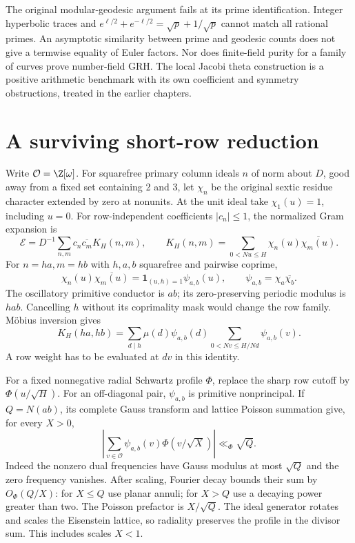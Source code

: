 \documentclass[11pt,oneside,openany]{book}
\theoremstyle{definition}\newtheorem{definition}[theorem]{Definition}
\theoremstyle{remark}\newtheorem{remark}[theorem]{Remark}
\begin{document}
The original modular-geodesic argument fails at its prime identification. Integer hyperbolic traces and $e^{\ell/2}+e^{-\ell/2}=\sqrt p+1/\sqrt p$ cannot match all rational primes. An asymptotic similarity between prime and geodesic counts does not give a termwise equality of Euler factors. Nor does finite-field purity for a family of curves prove number-field GRH. The local Jacobi theta construction is a positive arithmetic benchmark with its own coefficient and symmetry obstructions, treated in the earlier chapters.

\section{A surviving short-row reduction}
Write $\mathcal O=\Z[\omega]$. For squarefree primary column ideals $n$ of norm about $D$, good away from a fixed set containing 2 and 3, let $\chi_n$ be the original sextic residue character extended by zero at nonunits. At the unit ideal take $\chi_1(u)=1$, including $u=0$. For row-independent coefficients $|c_n|\le1$, the normalized Gram expansion is
\[
 \mathcal E=D^{-1}\sum_{n,m}c_n\overline{c_m}K_H(n,m),\qquad
 K_H(n,m)=\sum_{0<Nu\le H}\chi_n(u)\overline{\chi_m(u)}.
\]
For $n=ha,m=hb$ with $h,a,b$ squarefree and pairwise coprime,
\[
 \chi_n(u)\overline{\chi_m(u)}
 =\mathbf1_{(u,h)=1}\psi_{a,b}(u),\qquad \psi_{a,b}=\chi_a\overline{\chi_b}.
\]
The oscillatory primitive conductor is $ab$; its zero-preserving periodic modulus is $hab$. Cancelling $h$ without its coprimality mask would change the row family. M\"obius inversion gives
\[
 K_H(ha,hb)=\sum_{d\mid h}\mu(d)\psi_{a,b}(d)
  \sum_{0<Nv\le H/Nd}\psi_{a,b}(v).
\]
A row weight has to be evaluated at $dv$ in this identity.

For a fixed nonnegative radial Schwartz profile $\Phi$, replace the sharp row cutoff by $\Phi(u/\sqrt H)$. For an off-diagonal pair, $\psi_{a,b}$ is primitive nonprincipal. If $Q=N(ab)$, its complete Gauss transform and lattice Poisson summation give, for every $X>0$,
\[
 \left|\sum_{v\in\mathcal O}\psi_{a,b}(v)\Phi(v/\sqrt X)\right|\ll_\Phi\sqrt Q.
\]
Indeed the nonzero dual frequencies have Gauss modulus at most $\sqrt Q$ and the zero frequency vanishes. After scaling, Fourier decay bounds their sum by $O_\Phi(Q/X)$: for $X\le Q$ use planar annuli; for $X>Q$ use a decaying power greater than two. The Poisson prefactor is $X/\sqrt Q$. The ideal generator rotates and scales the Eisenstein lattice, so radiality preserves the profile in the divisor sum. This includes scales $X<1$.
\end{document}
